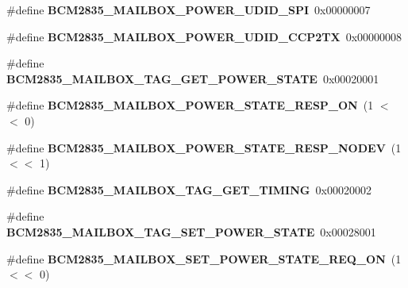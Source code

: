 \begin{DoxyCompactItemize}
\mbox{\label{group__raspberrypi__vc_ga121aa9fffbd20e233ad314b744b44430}} 
\#define {\bfseries B\+C\+M2835\+\_\+\+M\+A\+I\+L\+B\+O\+X\+\_\+\+P\+O\+W\+E\+R\+\_\+\+U\+D\+I\+D\+\_\+\+S\+PI}~0x00000007
\item 
\mbox{\label{group__raspberrypi__vc_gad91bce712eccc57a08221983b9826d8f}} 
\#define {\bfseries B\+C\+M2835\+\_\+\+M\+A\+I\+L\+B\+O\+X\+\_\+\+P\+O\+W\+E\+R\+\_\+\+U\+D\+I\+D\+\_\+\+C\+C\+P2\+TX}~0x00000008
\item 
\mbox{\label{group__raspberrypi__vc_ga9d81320bf64291108896c3a1be5d1b0e}} 
\#define {\bfseries B\+C\+M2835\+\_\+\+M\+A\+I\+L\+B\+O\+X\+\_\+\+T\+A\+G\+\_\+\+G\+E\+T\+\_\+\+P\+O\+W\+E\+R\+\_\+\+S\+T\+A\+TE}~0x00020001
\item 
\mbox{\label{group__raspberrypi__vc_ga9461cce50bf871d26eb95ab508ae3b1c}} 
\#define {\bfseries B\+C\+M2835\+\_\+\+M\+A\+I\+L\+B\+O\+X\+\_\+\+P\+O\+W\+E\+R\+\_\+\+S\+T\+A\+T\+E\+\_\+\+R\+E\+S\+P\+\_\+\+ON}~(1 $<$$<$ 0)
\item 
\mbox{\label{group__raspberrypi__vc_ga6cefdf9fc95ca11ee1b7f87100cdcc67}} 
\#define {\bfseries B\+C\+M2835\+\_\+\+M\+A\+I\+L\+B\+O\+X\+\_\+\+P\+O\+W\+E\+R\+\_\+\+S\+T\+A\+T\+E\+\_\+\+R\+E\+S\+P\+\_\+\+N\+O\+D\+EV}~(1 $<$$<$ 1)
\item 
\mbox{\label{group__raspberrypi__vc_ga895ed7b0aac1a145131942d06ce0d059}} 
\#define {\bfseries B\+C\+M2835\+\_\+\+M\+A\+I\+L\+B\+O\+X\+\_\+\+T\+A\+G\+\_\+\+G\+E\+T\+\_\+\+T\+I\+M\+I\+NG}~0x00020002
\item 
\mbox{\label{group__raspberrypi__vc_gac1d02f51d79d64f7014fcc13e7db79fa}} 
\#define {\bfseries B\+C\+M2835\+\_\+\+M\+A\+I\+L\+B\+O\+X\+\_\+\+T\+A\+G\+\_\+\+S\+E\+T\+\_\+\+P\+O\+W\+E\+R\+\_\+\+S\+T\+A\+TE}~0x00028001
\item 
\mbox{\label{group__raspberrypi__vc_ga726156a9056972f86bca2c0b709adf99}} 
\#define {\bfseries B\+C\+M2835\+\_\+\+M\+A\+I\+L\+B\+O\+X\+\_\+\+S\+E\+T\+\_\+\+P\+O\+W\+E\+R\+\_\+\+S\+T\+A\+T\+E\+\_\+\+R\+E\+Q\+\_\+\+ON}~(1 $<$$<$ 0)
\item 
$$
\end{DoxyCompactItemize}
